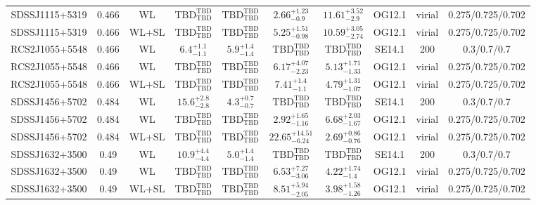 \begin{table}
\begin{tabular}{cccccccccc}
SDSSJ1115+5319 & 0.466 & WL & ${\mathrm{TBD}}^{\mathrm{TBD}}_{\mathrm{TBD}}$ & ${\mathrm{TBD}}^{\mathrm{TBD}}_{\mathrm{TBD}}$ & ${2.66}^{+1.23}_{-0.9}$ & ${11.61}^{+3.52}_{-2.9}$ & OG12.1 & virial & 0.275/0.725/0.702 \\
SDSSJ1115+5319 & 0.466 & WL+SL & ${\mathrm{TBD}}^{\mathrm{TBD}}_{\mathrm{TBD}}$ & ${\mathrm{TBD}}^{\mathrm{TBD}}_{\mathrm{TBD}}$ & ${5.25}^{+1.51}_{-0.98}$ & ${10.59}^{+3.05}_{-2.74}$ & OG12.1 & virial & 0.275/0.725/0.702 \\
RCS2J1055+5548 & 0.466 & WL & ${6.4}^{+1.1}_{-1.1}$ & ${5.9}^{+1.4}_{-1.4}$ & ${\mathrm{TBD}}^{\mathrm{TBD}}_{\mathrm{TBD}}$ & ${\mathrm{TBD}}^{\mathrm{TBD}}_{\mathrm{TBD}}$ & SE14.1 & 200 & 0.3/0.7/0.7 \\
RCS2J1055+5548 & 0.466 & WL & ${\mathrm{TBD}}^{\mathrm{TBD}}_{\mathrm{TBD}}$ & ${\mathrm{TBD}}^{\mathrm{TBD}}_{\mathrm{TBD}}$ & ${6.17}^{+4.07}_{-2.23}$ & ${5.13}^{+1.71}_{-1.33}$ & OG12.1 & virial & 0.275/0.725/0.702 \\
RCS2J1055+5548 & 0.466 & WL+SL & ${\mathrm{TBD}}^{\mathrm{TBD}}_{\mathrm{TBD}}$ & ${\mathrm{TBD}}^{\mathrm{TBD}}_{\mathrm{TBD}}$ & ${7.41}^{+1.4}_{-1.1}$ & ${4.79}^{+1.31}_{-1.07}$ & OG12.1 & virial & 0.275/0.725/0.702 \\
SDSSJ1456+5702 & 0.484 & WL & ${15.6}^{+2.8}_{-2.8}$ & ${4.3}^{+0.7}_{-0.7}$ & ${\mathrm{TBD}}^{\mathrm{TBD}}_{\mathrm{TBD}}$ & ${\mathrm{TBD}}^{\mathrm{TBD}}_{\mathrm{TBD}}$ & SE14.1 & 200 & 0.3/0.7/0.7 \\
SDSSJ1456+5702 & 0.484 & WL & ${\mathrm{TBD}}^{\mathrm{TBD}}_{\mathrm{TBD}}$ & ${\mathrm{TBD}}^{\mathrm{TBD}}_{\mathrm{TBD}}$ & ${2.92}^{+1.65}_{-1.16}$ & ${6.68}^{+2.03}_{-1.67}$ & OG12.1 & virial & 0.275/0.725/0.702 \\
SDSSJ1456+5702 & 0.484 & WL+SL & ${\mathrm{TBD}}^{\mathrm{TBD}}_{\mathrm{TBD}}$ & ${\mathrm{TBD}}^{\mathrm{TBD}}_{\mathrm{TBD}}$ & ${22.65}^{+14.51}_{-6.24}$ & ${2.69}^{+0.86}_{-0.76}$ & OG12.1 & virial & 0.275/0.725/0.702 \\
SDSSJ1632+3500 & 0.49 & WL & ${10.9}^{+4.4}_{-4.4}$ & ${5.0}^{+1.4}_{-1.4}$ & ${\mathrm{TBD}}^{\mathrm{TBD}}_{\mathrm{TBD}}$ & ${\mathrm{TBD}}^{\mathrm{TBD}}_{\mathrm{TBD}}$ & SE14.1 & 200 & 0.3/0.7/0.7 \\
SDSSJ1632+3500 & 0.49 & WL & ${\mathrm{TBD}}^{\mathrm{TBD}}_{\mathrm{TBD}}$ & ${\mathrm{TBD}}^{\mathrm{TBD}}_{\mathrm{TBD}}$ & ${6.53}^{+7.27}_{-3.06}$ & ${4.22}^{+1.74}_{-1.4}$ & OG12.1 & virial & 0.275/0.725/0.702 \\
SDSSJ1632+3500 & 0.49 & WL+SL & ${\mathrm{TBD}}^{\mathrm{TBD}}_{\mathrm{TBD}}$ & ${\mathrm{TBD}}^{\mathrm{TBD}}_{\mathrm{TBD}}$ & ${8.51}^{+5.94}_{-2.05}$ & ${3.98}^{+1.58}_{-1.26}$ & OG12.1 & virial & 0.275/0.725/0.702 \\

\end{tabular}
\end{table}

